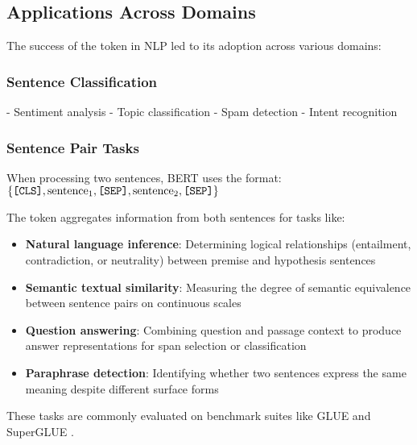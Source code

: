 \subsection{Applications Across Domains}

The success of the \cls{} token in NLP led to its adoption across various domains:

\subsubsection{Sentence Classification}
- Sentiment analysis
- Topic classification  
- Spam detection
- Intent recognition

\begin{comment}
Feedback: Convert the above into latex items, with a little elaboration.
\end{comment}

\subsubsection{Sentence Pair Tasks}
When processing two sentences, BERT uses the format:
$\{\texttt{[CLS]}{}, \text{sentence}_1, \texttt{[SEP]}{}, \text{sentence}_2, \texttt{[SEP]}{}\}$

The \cls{} token aggregates information from both sentences for tasks like:
\begin{itemize}
\item \textbf{Natural language inference}: Determining logical relationships (entailment, contradiction, or neutrality) between premise and hypothesis sentences
\item \textbf{Semantic textual similarity}: Measuring the degree of semantic equivalence between sentence pairs on continuous scales
\item \textbf{Question answering}: Combining question and passage context to produce answer representations for span selection or classification
\item \textbf{Paraphrase detection}: Identifying whether two sentences express the same meaning despite different surface forms
\end{itemize}

\begin{comment}
Feedback: Convert the above into latex items, with a little elaboration.

STATUS: addressed - converted to proper LaTeX items with detailed elaborations for each task type
\end{comment}

These tasks are commonly evaluated on benchmark suites like GLUE \citep{wang2018glue} and SuperGLUE \citep{wang2019superglue}.

